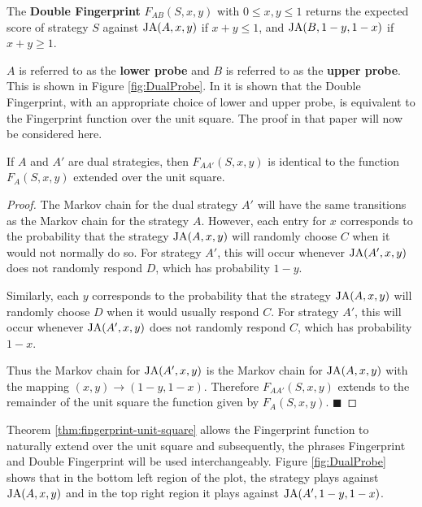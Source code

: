 \begin{definition}\label{def:double-fingerprint}
The \textbf{Double Fingerprint} $F_{AB}(S, x, y)$ with $0 \leq x, y \leq 1$ returns the expected score of strategy $S$ against $\text{JA}(A, x, y)$ if $x+y \leq 1$, and $\text{JA}(B, 1-y, 1-x)$ if $x+y \geq 1$.
\end{definition}

$A$ is referred to as the \textbf{lower probe} and $B$ is referred to as the \textbf{upper probe}.
This is shown in Figure \ref{fig:DualProbe}.
In \cite{Ashlock2004} it is shown that the Double Fingerprint, with an appropriate choice of lower and upper probe, is equivalent to the Fingerprint function over the unit square.
The proof in that paper will now be considered here.

\begin{theorem}\label{thm:fingerprint-unit-square}
If $A$ and $A'$ are dual strategies, then $F_{AA'}(S, x, y)$ is identical to the function $F_A(S, x, y)$ extended over the unit square.
\end{theorem}


\begin{proof}\label{prf:fingerprint-unit-square}
The Markov chain for the dual strategy $A'$ will have the same transitions as the Markov chain for the strategy $A$.
However, each entry for $x$ corresponds to the probability that the strategy $\text{JA}(A, x, y)$ will randomly choose $C$ when it would not normally do so.
For strategy $A'$, this will occur whenever $\text{JA}(A', x, y)$ does not randomly respond $D$, which has probability $1 - y$.

Similarly, each $y$ corresponds to the probability that the strategy $\text{JA}(A, x, y)$ will randomly choose $D$ when it would usually respond $C$.
For strategy $A'$, this will occur whenever $\text{JA}(A', x, y)$ does not randomly respond $C$, which has probability $1 - x$.

Thus the Markov chain for $\text{JA}(A', x, y)$ is the Markov chain for $\text{JA}(A, x, y)$ with the mapping $(x, y) \rightarrow (1-y, 1-x)$.
Therefore $F_{AA'}(S, x, y)$ extends to the remainder of the unit square the function given by $F_A(S, x, y)$. $\blacksquare$
\end{proof}

Theorem \ref{thm:fingerprint-unit-square} allows the Fingerprint function to naturally extend over the unit square and subsequently, the phrases Fingerprint and Double Fingerprint will be used interchangeably.
Figure \ref{fig:DualProbe} shows that in the \textcolor{sol-violet}{bottom left} region of the plot, the strategy plays against $\text{JA}(A, x, y)$ and in the \textcolor{sol-cyan}{top right} region it plays against $\text{JA}(A', 1-y, 1-x)$.

